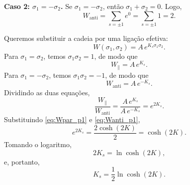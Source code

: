 \documentclass[12pt,a4paper]{article}
\begin{document}
\medskip
\noindent\textbf{Caso 2: \(\sigma_1=-\sigma_2\).}
%
Se \(\sigma_1=-\sigma_2\), então \(\sigma_1+\sigma_2=0\). Logo,
%
\begin{equation}
    W_{\mathrm{anti}}
    =
    \sum_{s=\pm1}
    e^{0}
    =
    \sum_{s=\pm1}1
    =
    2.
    \label{eq:Wanti_p1}
\end{equation}

\medskip
Queremos substituir a cadeia por uma ligação efetiva:
%
\begin{equation}
    W(\sigma_1,\sigma_2)
    =
    A\,e^{K_s\sigma_1\sigma_2}.
    \label{eq:W_eff_p1}
\end{equation}
%
Para \(\sigma_1=\sigma_2\), temos \(\sigma_1\sigma_2=1\), de modo que
%
\begin{equation}
    W_{\parallel}=A\,e^{K_s}.
\end{equation}
%
Para \(\sigma_1=-\sigma_2\), temos \(\sigma_1\sigma_2=-1\), de modo que
%
\begin{equation}
    W_{\mathrm{anti}}=A\,e^{-K_s}.
\end{equation}
%
Dividindo as duas equações,
%
\begin{equation}
    \frac{W_{\parallel}}{W_{\mathrm{anti}}}
    =
    \frac{A\,e^{K_s}}{A\,e^{-K_s}}
    =
    e^{2K_s}.
\end{equation}
%
Substituindo \eqref{eq:Wpar_p1} e \eqref{eq:Wanti_p1},
%
\begin{equation}
    e^{2K_s}
    =
    \frac{2\cosh(2K)}{2}
    =
    \cosh(2K).
    \label{eq:e2Ks_p1}
\end{equation}
%
Tomando o logaritmo,
%
\begin{equation}
    2K_s=\ln\cosh(2K),
\end{equation}
%
e, portanto,
%
\begin{equation}
    \boxed{
    K_s
    =
    \frac12\ln\cosh(2K).
    }
    \label{eq:Ks_p1}
\end{equation}
\end{document}
